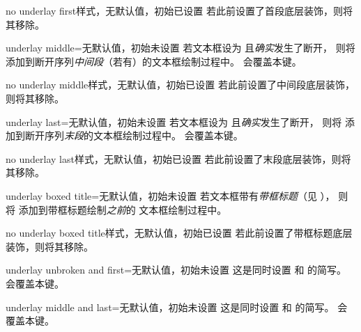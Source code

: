 \begin{docTcbKey}{no underlay first}{}{样式，无默认值，初始已设置}
  若此前设置了首段底层装饰，则将其移除。
\end{docTcbKey}

\begin{docTcbKey}{underlay middle}{=}{无默认值，初始未设置}
  若文本框设为  且\emph{确实}发生了断开，
  则将  添加到断开序列\emph{中间段}（若有）的文本框绘制过程中。
   会覆盖本键。
\end{docTcbKey}

\begin{docTcbKey}{no underlay middle}{}{样式，无默认值，初始已设置}
  若此前设置了中间段底层装饰，则将其移除。
\end{docTcbKey}

\begin{docTcbKey}{underlay last}{=}{无默认值，初始未设置}
  若文本框设为  且\emph{确实}发生了断开，
  则将  添加到断开序列\emph{末段}的文本框绘制过程中。
   会覆盖本键。
\end{docTcbKey}

\begin{docTcbKey}{no underlay last}{}{样式，无默认值，初始已设置}
  若此前设置了末段底层装饰，则将其移除。
\end{docTcbKey}

\begin{docTcbKey}{underlay boxed title}{=}{无默认值，初始未设置}
  若文本框带有\emph{带框标题}（见 ），
  则将  添加到带框标题绘制\emph{之前}的
  文本框绘制过程中。
\end{docTcbKey}

\begin{docTcbKey}{no underlay boxed title}{}{样式，无默认值，初始已设置}
  若此前设置了带框标题底层装饰，则将其移除。
\end{docTcbKey}

\begin{docTcbKey}{underlay unbroken and first}{=}{无默认值，初始未设置}
  这是同时设置
   和
   的简写。
   会覆盖本键。
\end{docTcbKey}

\begin{docTcbKey}{underlay middle and last}{=}{无默认值，初始未设置}
  这是同时设置
   和
   的简写。
   会覆盖本键。
\end{docTcbKey}

